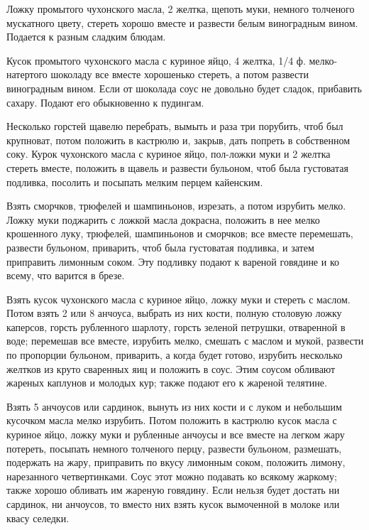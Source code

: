 
Ложку промытого чухонского масла, 2 желтка, щепоть муки, немного толченого мускатного цвету, стереть хорошо вместе и развести белым виноградным вином. Подается к разным сладким блюдам. 


Кусок промытого чухонского масла с куриное яйцо, 4 желтка, 1/4 ф. мелко-натертого шоколаду все вместе хорошенько стереть, а потом развести виноградным вином. Если от шоколада соус не довольно будет сладок, прибавить сахару. Подают его обыкновенно к пудингам. 


Несколько горстей щавелю перебрать, вымыть и раза три порубить, чтоб был крупноват, потом положить в кастрюлю и, закрыв, дать попреть в собственном соку. Курок чухонского масла с куриное яйцо, пол-ложки муки и 2 желтка стереть вместе, положить в щавель и развести бульоном, чтоб была густоватая подливка, посолить и посыпать мелким перцем кайенским. 


Взять сморчков, трюфелей и шампиньонов, изрезать, а потом изрубить мелко. Ложку муки поджарить с ложкой масла докрасна, положить в нее мелко крошенного луку, трюфелей, шампиньонов и сморчков; все вместе перемешать, развести бульоном, приварить, чтоб была густоватая подливка, и затем приправить лимонным соком. Эту подливку подают к вареной говядине и ко всему, что варится в брезе. 


Взять кусок чухонского масла с куриное яйцо, ложку муки и стереть с маслом. Потом взять 2 или 8 анчоуса, выбрать из них кости, полную столовую ложку каперсов, горсть рубленного шарлоту, горсть зеленой петрушки, отваренной в воде; перемешав все вместе, изрубить мелко, смешать с маслом и мукой, развести по пропорции бульоном, приварить, а когда будет готово, изрубить несколько желтков из круто сваренных яиц и положить в соус. Этим соусом обливают жареных каплунов и молодых кур; также подают его к жареной телятине. 


Взять 5 анчоусов или сардинок, вынуть из них кости и с луком и небольшим кусочком масла мелко изрубить. Потом положить в кастрюлю кусок масла с куриное яйцо, ложку муки и рубленные анчоусы и все вместе на легком жару потереть, посыпать немного толченого перцу, развести бульоном, размешать, подержать на жару, приправить по вкусу лимонным соком, положить лимону, нарезанного четвертинками. Соус этот можно подавать ко всякому жаркому; также хорошо обливать им жареную говядину. Если нельзя будет достать ни сардинок, ни анчоусов, то вместо них взять кусок вымоченной в молоке или квасу селедки. 

